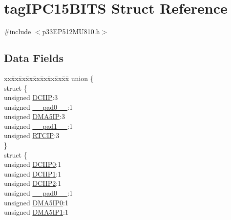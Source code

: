 \hypertarget{structtag_i_p_c15_b_i_t_s}{}\section{tag\+I\+P\+C15\+B\+I\+TS Struct Reference}
\label{structtag_i_p_c15_b_i_t_s}


{\ttfamily \#include $<$p33\+E\+P512\+M\+U810.\+h$>$}

\subsection*{Data Fields}
\begin{DoxyCompactItemize}
\item 
\begin{tabbing}
xx\=xx\=xx\=xx\=xx\=xx\=xx\=xx\=xx\=\kill
union \{\\
\>struct \{\\
\>\>unsigned \hyperlink{structtag_i_p_c15_b_i_t_s_a518801142872bcccd77fa9b2164aa642}{DCIIP}:3\\
\>\>unsigned \hyperlink{structtag_i_p_c15_b_i_t_s_adf71f3d8410c1f1dbbc96680a92c49af}{\_\_pad0\_\_}:1\\
\>\>unsigned \hyperlink{structtag_i_p_c15_b_i_t_s_ae2faabdc266b69d1ba0a992d15c88292}{DMA5IP}:3\\
\>\>unsigned \hyperlink{structtag_i_p_c15_b_i_t_s_acaf2d0924a107ec6e8d2e31febaf66f9}{\_\_pad1\_\_}:1\\
\>\>unsigned \hyperlink{structtag_i_p_c15_b_i_t_s_a4afc245f24bf1cda0e5b1c4ab4b166f0}{RTCIP}:3\\
\>\} \\
\>struct \{\\
\>\>unsigned \hyperlink{structtag_i_p_c15_b_i_t_s_a140ff94ac3596fd0bc13b96d2405ac25}{DCIIP0}:1\\
\>\>unsigned \hyperlink{structtag_i_p_c15_b_i_t_s_a77a44d76279477ada2d08c84bbb8e69d}{DCIIP1}:1\\
\>\>unsigned \hyperlink{structtag_i_p_c15_b_i_t_s_a6e0441da0d475503d868d8955bf62d38}{DCIIP2}:1\\
\>\>unsigned \hyperlink{structtag_i_p_c15_b_i_t_s_adf71f3d8410c1f1dbbc96680a92c49af}{\_\_pad0\_\_}:1\\
\>\>unsigned \hyperlink{structtag_i_p_c15_b_i_t_s_a528d259f88d43096e4eeb965450044b8}{DMA5IP0}:1\\
\>\>unsigned \hyperlink{structtag_i_p_c15_b_i_t_s_aa7d034d42c120c62e35fe17a5809eb7a}{DMA5IP1}:1\\

\end{tabbing}
\end{DoxyCompactItemize}
